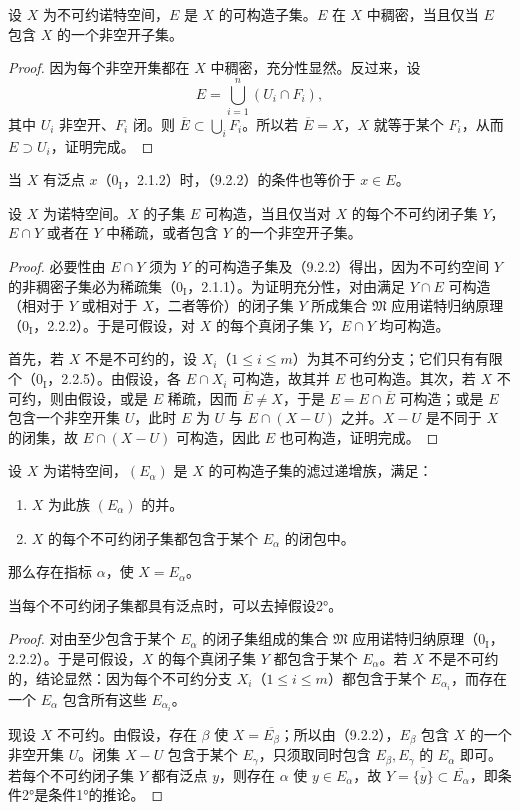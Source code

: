 设 $X$ 为不可约诺特空间，$E$ 是 $X$ 的可构造子集。$E$ 在 $X$ 中稠密，当且仅当 $E$ 包含 $X$ 的一个非空开子集。
\begin{proof}
因为每个非空开集都在 $X$ 中稠密，充分性显然。反过来，设
\[
E=\bigcup_{i=1}^{n}(U_i\cap F_i),
\]
其中 $U_i$ 非空开、$F_i$ 闭。则 $\overline E\subset\bigcup_iF_i$。所以若 $\overline E=X$，$X$ 就等于某个 $F_i$，从而 $E\supset U_i$，证明完成。
\end{proof}
当 $X$ 有泛点 $x$（$0_{\mathrm I}$，2.1.2）时，（9.2.2）的条件也等价于 $x\in E$。

设 $X$ 为诺特空间。$X$ 的子集 $E$ 可构造，当且仅当对 $X$ 的每个不可约闭子集 $Y$，$E\cap Y$ 或者在 $Y$ 中稀疏，或者包含 $Y$ 的一个非空开子集。
\begin{proof}
必要性由 $E\cap Y$ 须为 $Y$ 的可构造子集及（9.2.2）得出，因为不可约空间 $Y$ 的非稠密子集必为稀疏集（$0_{\mathrm I}$，2.1.1）。为证明充分性，对由满足 $Y\cap E$ 可构造（相对于 $Y$ 或相对于 $X$，二者等价）的闭子集 $Y$ 所成集合 $\mathfrak M$ 应用诺特归纳原理（$0_{\mathrm I}$，2.2.2）。于是可假设，对 $X$ 的每个真闭子集 $Y$，$E\cap Y$ 均可构造。

首先，若 $X$ 不是不可约的，设 $X_i$（$1\leq i\leq m$）为其不可约分支；它们只有有限个（$0_{\mathrm I}$，2.2.5）。由假设，各 $E\cap X_i$ 可构造，故其并 $E$ 也可构造。其次，若 $X$ 不可约，则由假设，或是 $E$ 稀疏，因而 $\overline E\ne X$，于是 $E=E\cap\overline E$ 可构造；或是 $E$ 包含一个非空开集 $U$，此时 $E$ 为 $U$ 与 $E\cap(X-U)$ 之并。$X-U$ 是不同于 $X$ 的闭集，故 $E\cap(X-U)$ 可构造，因此 $E$ 也可构造，证明完成。
\end{proof}

设 $X$ 为诺特空间，$(E_\alpha)$ 是 $X$ 的可构造子集的滤过递增族，满足：
\begin{enumerate}[label=\arabic*°]
\item $X$ 为此族 $(E_\alpha)$ 的并。
\item $X$ 的每个不可约闭子集都包含于某个 $E_\alpha$ 的闭包中。
\end{enumerate}
那么存在指标 $\alpha$，使 $X=E_\alpha$。

当每个不可约闭子集都具有泛点时，可以去掉假设2°。
\begin{proof}
对由至少包含于某个 $E_\alpha$ 的闭子集组成的集合 $\mathfrak M$ 应用诺特归纳原理（$0_{\mathrm I}$，2.2.2）。于是可假设，$X$ 的每个真闭子集 $Y$ 都包含于某个 $E_\alpha$。若 $X$ 不是不可约的，结论显然：因为每个不可约分支 $X_i$（$1\leq i\leq m$）都包含于某个 $E_{\alpha_i}$，而存在一个 $E_\alpha$ 包含所有这些 $E_{\alpha_i}$。

现设 $X$ 不可约。由假设，存在 $\beta$ 使 $X=\overline{E_\beta}$；所以由（9.2.2），$E_\beta$ 包含 $X$ 的一个非空开集 $U$。闭集 $X-U$ 包含于某个 $E_\gamma$，只须取同时包含 $E_\beta,E_\gamma$ 的 $E_\alpha$ 即可。若每个不可约闭子集 $Y$ 都有泛点 $y$，则存在 $\alpha$ 使 $y\in E_\alpha$，故 $Y=\overline{\{y\}}\subset\overline{E_\alpha}$，即条件2°是条件1°的推论。
\end{proof}

